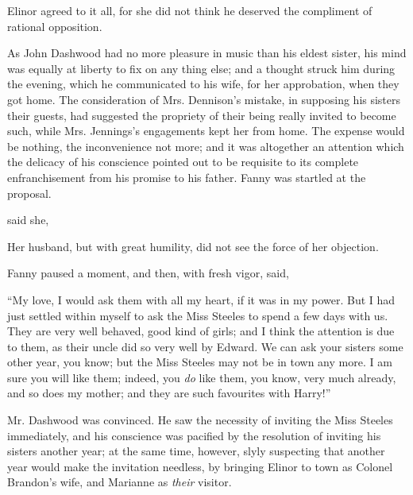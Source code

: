 Elinor agreed to it all, for she did not think he deserved the compliment of rational opposition.

As John Dashwood had no more pleasure in music than his eldest sister, his mind was equally at liberty to fix on any thing else; and a thought struck him during the evening, which he communicated to his wife, for her approbation, when they got home. The consideration of Mrs. Dennison's mistake, in supposing his sisters their guests, had suggested the propriety of their being really invited to become such, while Mrs. Jennings's engagements kept her from home. The expense would be nothing, the inconvenience not more; and it was altogether an attention which the delicacy of his conscience pointed out to be requisite to its complete enfranchisement from his promise to his father. Fanny was startled at the proposal.

 said she, 

Her husband, but with great humility, did not see the force of her objection. 

Fanny paused a moment, and then, with fresh vigor, said,

“My love, I would ask them with all my heart, if it was in my power. But I had just settled within myself to ask the Miss Steeles to spend a few days with us. They are very well behaved, good kind of girls; and I think the attention is due to them, as their uncle did so very well by Edward. We can ask your sisters some other year, you know; but the Miss Steeles may not be in town any more. I am sure you will like them; indeed, you {\em do} like them, you know, very much already, and so does my mother; and they are such favourites with Harry!”

Mr. Dashwood was convinced. He saw the necessity of inviting the Miss Steeles immediately, and his conscience was pacified by the resolution of inviting his sisters another year; at the same time, however, slyly suspecting that another year would make the invitation needless, by bringing Elinor to town as Colonel Brandon's wife, and Marianne as {\em their} visitor.

